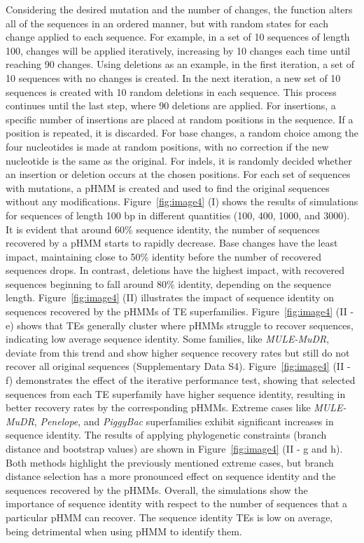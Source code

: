 \documentclass[unnumsec,webpdf,contemporary,large]{oup-authoring-template}%
\theoremstyle{thmstyleone}%
\theoremstyle{thmstyletwo}%
\theoremstyle{thmstylethree}%
\begin{document}
Considering the desired mutation and the number of changes, the function alters
all of the sequences in an ordered manner, but with random states for each
change applied to each sequence. For example, in a set of 10 sequences of length
100, changes will be applied iteratively, increasing by 10 changes each time
until reaching 90 changes. Using deletions as an example, in the first
iteration, a set of 10 sequences with no changes is created. In the next
iteration, a new set of 10 sequences is created with 10 random deletions in each
sequence. This process continues until the last step, where 90 deletions are
applied. For insertions, a specific number of insertions are placed at random
positions in the sequence. If a position is repeated, it is discarded. For base
changes, a random choice among the four nucleotides is made at random positions,
with no correction if the new nucleotide is the same as the original. For
indels, it is randomly decided whether an insertion or deletion occurs at the
chosen positions. For each set of sequences with mutations, a pHMM is created
and used to find the original sequences without any modifications. Figure~\ref*{fig:image4} (I)
shows the results of simulations for sequences of length 100 bp in different
quantities (100, 400, 1000, and 3000). It is evident that around 60\% sequence
identity, the number of sequences recovered by a pHMM starts to rapidly
decrease. Base changes have the least impact, maintaining close to 50\% identity
before the number of recovered sequences drops. In contrast, deletions have the
highest impact, with recovered sequences beginning to fall around 80\% identity,
depending on the sequence length. Figure~\ref*{fig:image4} (II) illustrates the impact of sequence
identity on sequences recovered by the pHMMs of TE superfamilies. Figure~\ref*{fig:image4} (II {-} e)
shows that TEs generally cluster where pHMMs struggle to recover sequences,
indicating low average sequence identity. Some families, like \textit{MULE{-}MuDR}, deviate
from this trend and show higher sequence recovery rates but still do not recover
all original sequences (Supplementary Data S4). Figure~\ref*{fig:image4} (II {-} f) demonstrates the
effect of the iterative performance test, showing that selected sequences from
each TE superfamily have higher sequence identity, resulting in better recovery
rates by the corresponding pHMMs. Extreme cases like \textit{MULE{-}MuDR}, \textit{Penelope}, and
\textit{PiggyBac} superfamilies exhibit significant increases in sequence identity. The
results of applying phylogenetic constraints (branch distance and bootstrap
values) are shown in Figure~\ref*{fig:image4} (II {-} g and h). Both methods highlight the previously
mentioned extreme cases, but branch distance selection has a more pronounced
effect on sequence identity and the sequences recovered by the pHMMs. Overall,
the simulations show the importance of sequence identity with respect to the
number of sequences that a particular pHMM can recover. The sequence identity
TEs is low on average, being detrimental when using pHMM to identify them.
\end{document}
